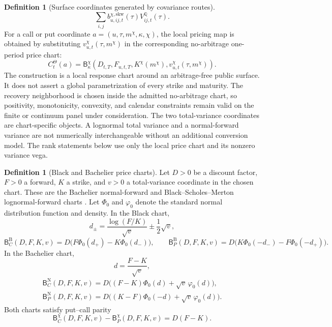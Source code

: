 \documentclass[11pt,a4paper]{amsart}
\theoremstyle{plain}
\theoremstyle{definition}
\newtheorem{definition}[theorem]{Definition}
\theoremstyle{remark}
\newcommand{\QQ}{\mathbb{Q}}
\begin{document}
\begin{definition}[Surface coordinates generated by covariance routes]
\[        \sum_{i,j} b^{\chi,\mathrm{skw}}_{u,ij,t}(\tau)V_{ij,t}^\QQ(\tau).
\]
For a call or put coordinate \(a=(u,\tau,m^\chi,\kappa,\chi)\), the local pricing map is obtained
by substituting \(v_{u,t}^{\chi}(\tau,m^\chi)\) in the corresponding no-arbitrage one-period
price chart:
\[
        C_t^\Theta(a)
        =
        \mathsf B_\kappa^\chi
        \!\left(D_{t,T},F_{u,t,T},K^\chi(m^\chi),v_{u,t}^{\chi}(\tau,m^\chi)\right).
\]
The construction is a local response chart around an arbitrage-free public surface.  It does not assert
a global parametrization of every strike and maturity.  The recovery neighborhood is chosen inside the
admitted no-arbitrage chart, so positivity, monotonicity, convexity, and calendar constraints
remain valid on the finite or continuum panel under consideration.
The two total-variance coordinates are chart-specific objects.  A lognormal total variance and a
normal-forward variance are not numerically interchangeable without an additional conversion
model.  The rank statements below use only the local price chart and its nonzero variance vega.
\end{definition}

\begin{definition}[Black and Bachelier price charts]\label{def:black-bachelier-charts}
Let \(D>0\) be a discount factor, \(F>0\) a forward, \(K\) a strike, and \(v>0\) a total-variance
coordinate in the chosen chart.  These are the Bachelier normal-forward and
Black--Scholes--Merton lognormal-forward charts \cite{bachelier1900,blackScholes1973,merton1973}.
Let \(\Phi_0\) and \(\varphi_0\) denote the standard normal distribution function and density.  In
the Black chart,
\[
        d_\pm=\frac{\log(F/K)}{\sqrt v}\pm\frac12\sqrt v,
\]
\[
        \mathsf B_C^{\mathrm B}(D,F,K,v)
        =
        D\bigl(F\Phi_0(d_+)-K\Phi_0(d_-)\bigr),
        \qquad
        \mathsf B_P^{\mathrm B}(D,F,K,v)
        =
        D\bigl(K\Phi_0(-d_-)-F\Phi_0(-d_+)\bigr).
\]
In the Bachelier chart,
\[
        d=\frac{F-K}{\sqrt v},
\]
\begin{align*}
        \mathsf B_C^{\mathrm N}(D,F,K,v)
        =
        D\bigl((F-K)\Phi_0(d)+\sqrt v\,\varphi_0(d)\bigr),\\
        \mathsf B_P^{\mathrm N}(D,F,K,v)
        =
        D\bigl((K-F)\Phi_0(-d)+\sqrt v\,\varphi_0(d)\bigr).
\end{align*}
Both charts satisfy put--call parity
\[
        \mathsf B_C^{\chi}(D,F,K,v)-\mathsf B_P^{\chi}(D,F,K,v)=D(F-K).
\]
\end{definition}
\end{document}
